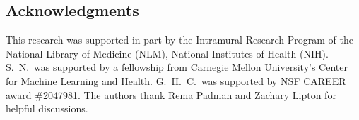 \subsection*{Acknowledgments}

This research was supported in part by the Intramural Research Program of the National Library of Medicine (NLM), National Institutes of Health (NIH). %
S.~N.~was supported by a fellowship from Carnegie Mellon University's Center for Machine Learning and Health.
G.~H.~C.~was supported by NSF CAREER award \#2047981. The authors thank Rema Padman and Zachary Lipton for helpful discussions.

